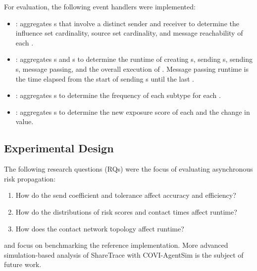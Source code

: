 For evaluation, the following event handlers were implemented:

\begin{itemize}
  \item {}: aggregates s that involve a distinct sender and receiver to determine the influence set cardinality, source set cardinality, and message reachability of each .
  \item {}: aggregates s and s to determine the runtime of creating s, sending s, sending s, message passing, and the overall execution of . Message passing runtime is the time elapsed from the start of sending s until the last .
  \item {}: aggregates s to determine the frequency of each subtype for each .
  \item {}: aggregates s to determine the new exposure score of each  and the change in value.
\end{itemize}

\subsection{Experimental Design}

\newcommand{\researchQuestion}{RQ\xspace}
\newcommand{\researchQuestions}{RQs\xspace}

The following research questions (\researchQuestions) were the focus of evaluating asynchronous risk propagation:
\begin{enumerate}[noitemsep, ref={\researchQuestion \arabic*}]
  \item How do the send coefficient and tolerance affect accuracy and efficiency? \label{rq:parameters}
  \item How do the distributions of risk scores and contact times affect runtime? \label{rq:distributions}
  \item How does the contact network topology affect runtime? \label{rq:topology}
\end{enumerate}
 and  focus on benchmarking the reference implementation. More advanced simulation-based analysis of ShareTrace with COVI-AgentSim \citep{Gupta2020} is the subject of future work.

